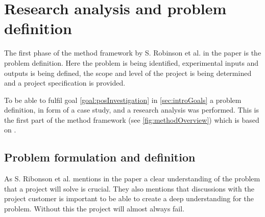\section{Research analysis and problem definition}\label{sec:methodProblemDefinition}
The first phase of the method framework by S. Robinson et al. in the paper \cite{SecretsSuccessfulSimulation1995} is the problem definition.
Here the problem is being identified, experimental inputs and outputs is being defined, the scope and level of the project is being determined and a project specification is provided.





\bigskip

To be able to fulfil goal \ref{goal:posInvestigation} in \cref{sec:introGoals} a problem definition, in form of a case study, and a research analysis was performed.
This is the first part of the method framework (see \cref{fig:methodOverview}) which is based on \cite{SecretsSuccessfulSimulation1995}.


\subsection{Problem formulation and definition}\label{sec:}
As S. Ribonson et al. mentions in the paper \cite{SecretsSuccessfulSimulation1995} a clear understanding of the problem that a project will solve is crucial.
They also mentions that discussions with the project customer is important to be able to create a deep understanding for the problem.
Without this the project will almost always fail.


